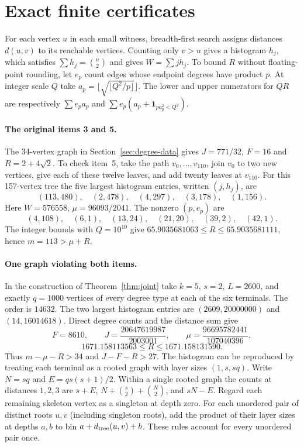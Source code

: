 \documentclass[11pt,a4paper]{article}
\theoremstyle{remark}\newtheorem*{remark}{Remark}
\begin{document}
\section{Exact finite certificates}\label{sec:finitecert}
For each vertex $u$ in each small witness, breadth-first search assigns distances $d(u,v)$ to its reachable vertices. Counting only $v>u$ gives a histogram $h_j$, which satisfies $\sum h_j=\binom n2$ and gives $W=\sum jh_j$. To bound $R$ without floating-point rounding, let $e_p$ count edges whose endpoint degrees have product $p$. At integer scale $Q$ take $a_p=\lfloor\sqrt{\lfloor Q^2/p\rfloor}\rfloor$. The lower and upper numerators for $QR$ are respectively $\sum e_pa_p$ and $\sum e_p(a_p+\mathbf1_{pa_p^2<Q^2})$.

\paragraph{The original items 3 and 5.} The 34-vertex graph in Section~\ref{sec:degree-data} gives $J=771/32$, $F=16$ and $R=2+4\sqrt2$. To check item~5, take the path $v_0,\ldots,v_{110}$, join $v_0$ to two new vertices, give each of these twelve leaves, and add twenty leaves at $v_{110}$. For this 157-vertex tree the five largest histogram entries, written $(j,h_j)$, are
\[
 (113,480),\quad(2,478),\quad(4,297),\quad(3,178),\quad(1,156).
\]
Here $W=576558$, $\mu=96093/2041$. The nonzero $(p,e_p)$ are
\[ (4,108),\quad(6,1),\quad(13,24),\quad(21,20),\quad(39,2),\quad(42,1).\] The integer bounds with $Q=10^{10}$ give $65.9035681063\le R\le65.9035681111$, hence $m=113>\mu+R$.

\paragraph{One graph violating both items.} In the construction of Theorem~\ref{thm:joint} take $k=5$, $s=2$, $L=2600$, and exactly $q=1000$ vertices of every degree type at each of the six terminals. The order is $14632$. The two largest histogram entries are $(2609,20000000)$ and $(14,16014618)$. Direct degree counts and the distance sum give
\[
 F=8610,\qquad J=\frac{20647619987}{2003001},\qquad
 \mu=\frac{96695782441}{107040396},\]
\[
 1671.158113563\le R\le1671.158131590 .
\]
Thus $m-\mu-R>34$ and $J-F-R>27$. The histogram can be reproduced by treating each terminal as a rooted graph with layer sizes $(1,s,sq)$. Write $N=sq$ and $E=qs(s+1)/2$. Within a single rooted graph the counts at distances $1,2,3$ are $s+E$, $N+\binom{s}{2}+\binom N2$, and $sN-E$. Regard each remaining skeleton vertex as a singleton at depth zero. For each unordered pair of distinct roots $u,v$ (including singleton roots), add the product of their layer sizes at depths $a,b$ to bin $a+d_{\rm tree}(u,v)+b$. These rules account for every unordered pair once.
\end{document}
